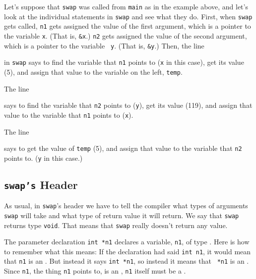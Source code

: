 Let's suppose that {\tt swap} was called from {\tt main} as in the
example above, and let's look at the individual statements in {\tt swap}
and see what they do.  First, when {\tt swap} gets called, {\tt n1} gets
assigned the value of the first argument, which is a pointer to the
variable {\tt x}.  (That is, {\tt\&x}.)  {\tt n2} gets assigned the
value of the second argument, which is a pointer to the variable {\tt
y}.  (That is, {\tt\&y}.)  Then, the line

\begin{flushleft}
\verb% temp = *n1; %
\end{flushleft}

\noindent in {\tt swap} says to find the variable that {\tt n1} points to
({\tt x} in this case), get its value (5), and assign that value to the
variable on the left, {\tt temp}.

The line 

\begin{flushleft}
\verb% *n1 = *n2; %
\end{flushleft}

\noindent says to find the variable that {\tt n2} points to
({\tt y}), get its value (119), and assign that value to the variable
that {\tt n1} points to ({\tt x}).

The line 

\begin{flushleft}
\verb% *n2 = temp; %
\end{flushleft}

\noindent says to get the value of {\tt temp} (5), and
assign that value to the variable that {\tt n2} points to.  ({\tt y} in
this case.)

\subsection{{\tt swap's} Header}

As usual, in {\tt swap}'s header we have to tell the compiler what types
of arguments {\tt swap} will take and what type of return value it will
return.  We say that {\tt swap} returns type {\tt void}.  That means
that {\tt swap} really doesn't return any value.

The parameter declaration {\tt int *n1} declares a variable, {\tt n1},
of type \Int.  Here is how to remember what this means:  If the
declaration had said {\tt int n1}, it would mean that {\tt n1} is an
\int.  But instead it says {\tt int *n1}, so instead it means that {\tt
*n1} is an \int.  Since {\tt *n1}, the thing {\tt n1} points to, is an
\int, {\tt n1} itself must be a \Int.

